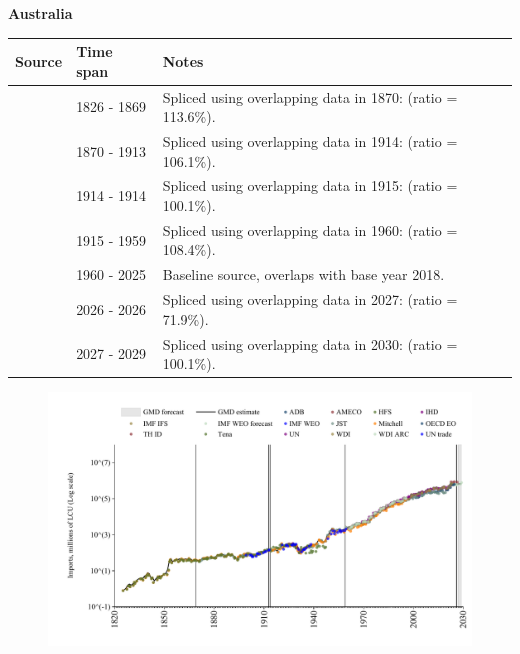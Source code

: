 \documentclass[12pt,a4paper,landscape]{article}
\begin{document}
\begin{adjustbox}{max totalsize={\paperwidth}{\paperheight},center}
\begin{minipage}[t][\textheight][t]{\textwidth}
\vspace*{0.5cm}
{}
\begin{center}
{\Large\bfseries Australia}
\end{center}
\vspace{0.5cm}
\begin{table}[H]
\centering
\small
\begin{tabular}{|l|l|l|}
\hline
\textbf{Source} & \textbf{Time span} & \textbf{Notes} \\
\hline
\rowcolor{white}\cite{Tena}& 1826 - 1869 &Spliced using overlapping data in 1870: (ratio = 113.6\%).\\
\rowcolor{lightgray}\cite{JST}& 1870 - 1913 &Spliced using overlapping data in 1914: (ratio = 106.1\%).\\
\rowcolor{white}\cite{Tena}& 1914 - 1914 &Spliced using overlapping data in 1915: (ratio = 100.1\%).\\
\rowcolor{lightgray}\cite{JST}& 1915 - 1959 &Spliced using overlapping data in 1960: (ratio = 108.4\%).\\
\rowcolor{white}\cite{OECD_EO}& 1960 - 2025 &Baseline source, overlaps with base year 2018.\\
\rowcolor{lightgray}\cite{AMECO}& 2026 - 2026 &Spliced using overlapping data in 2027: (ratio = 71.9\%).\\
\rowcolor{white}\cite{IMF_WEO_forecast}& 2027 - 2029 &Spliced using overlapping data in 2030: (ratio = 100.1\%).\\
\hline
\end{tabular}
\end{table}
\begin{figure}[H]
\centering
\includegraphics[width=\textwidth,height=0.6\textheight,keepaspectratio]{graphs/AUS_imports.pdf}
\end{figure}
\end{minipage}
\end{adjustbox}
\end{document}
